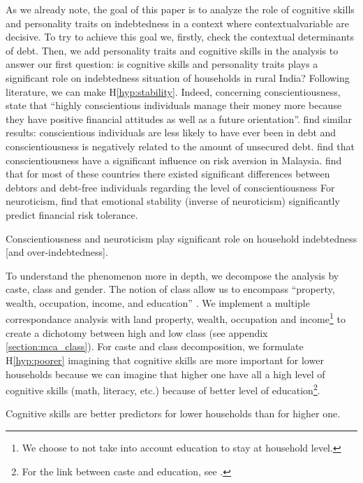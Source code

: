 \documentclass[a4paper, 11pt, onecolumn]{article}
\begin{document}
As we already note, the goal of this paper is to analyze the role of cognitive skills and personality traits on indebtedness in a context where contextualvariable are decisive.
To try to achieve this goal we, firstly, check the contextual determinants of debt.
Then, we add personality traits and cognitive skills in the analysis to answer our first question: is cognitive skills and personality traits plays a significant role on indebtedness situation of households in rural India?
Following literature, we can make H\ref{hyp:stability}.
Indeed, concerning conscientiousness, \cite{Donnelly2012} state that ``highly conscientious individuals manage their money more because they have positive financial attitudes as well as a future orientation''.
\cite{Brown2014, Nyhus2001} find similar results: conscientious individuals are less likely to have ever been in debt and conscientiousness is negatively related to the amount of unsecured debt.
\cite{Nga2013} find that conscientiousness have a significant influence on risk aversion in Malaysia.
\cite{Forlicz2019} find that for most of these countries there existed significant differences between debtors and debt-free individuals regarding the level of conscientiousness
For neuroticism, \cite{Pinjisakikool2017b} find that emotional stability (inverse of neuroticism) significantly predict financial risk tolerance.

\begin{hyp} \label{hyp:stability}
Conscientiousness and neuroticism play significant role on household indebtedness [and over-indebtedness].
\end{hyp}

To understand the phenomenon more in depth, we decompose the analysis by caste, class and gender.
The notion of class allow us to encompass ``property, wealth, occupation, income, and education'' \citep{Beteille2007}.
We implement a multiple correspondance analysis with land property, wealth, occupation and income\footnote{We choose to not take into account education to stay at household level.} to create a dichotomy between high and low class (see appendix \ref{section:mca_class}).
For caste and class decomposition, we formulate H\ref{hyp:poorer} imagining that cognitive skills are more important for lower households because we can imagine that higher one have all a high level of cognitive skills (math, literacy, etc.) because of better level of education\footnote{For the link between caste and education, see \cite{Borooah2005}.}.
\begin{hyp} \label{hyp:poorer}
Cognitive skills are better predictors for lower households than for higher one. 
\end{hyp}
\end{document}
